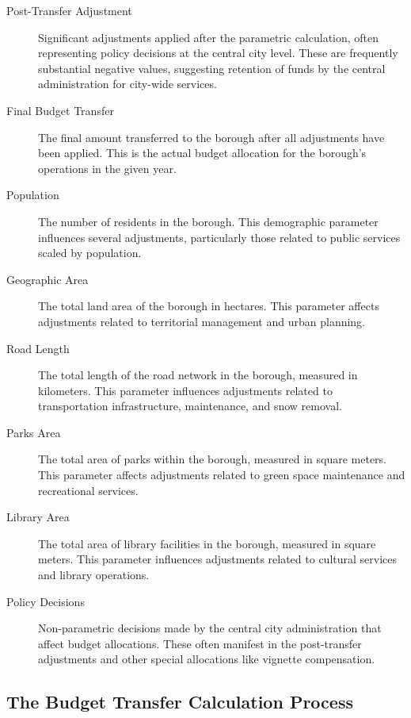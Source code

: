 \documentclass{article}
\begin{document}
\begin{description}
\item[Post-Transfer Adjustment] Significant adjustments applied after the parametric calculation, often representing policy decisions at the central city level. These are frequently substantial negative values, suggesting retention of funds by the central administration for city-wide services.

\item[Final Budget Transfer] The final amount transferred to the borough after all adjustments have been applied. This is the actual budget allocation for the borough's operations in the given year.

\item[Population] The number of residents in the borough. This demographic parameter influences several adjustments, particularly those related to public services scaled by population.

\item[Geographic Area] The total land area of the borough in hectares. This parameter affects adjustments related to territorial management and urban planning.

\item[Road Length] The total length of the road network in the borough, measured in kilometers. This parameter influences adjustments related to transportation infrastructure, maintenance, and snow removal.

\item[Parks Area] The total area of parks within the borough, measured in square meters. This parameter affects adjustments related to green space maintenance and recreational services.

\item[Library Area] The total area of library facilities in the borough, measured in square meters. This parameter influences adjustments related to cultural services and library operations.

\item[Policy Decisions] Non-parametric decisions made by the central city administration that affect budget allocations. These often manifest in the post-transfer adjustments and other special allocations like vignette compensation.
\end{description}


\subsection{The Budget Transfer Calculation Process}
\end{document}
